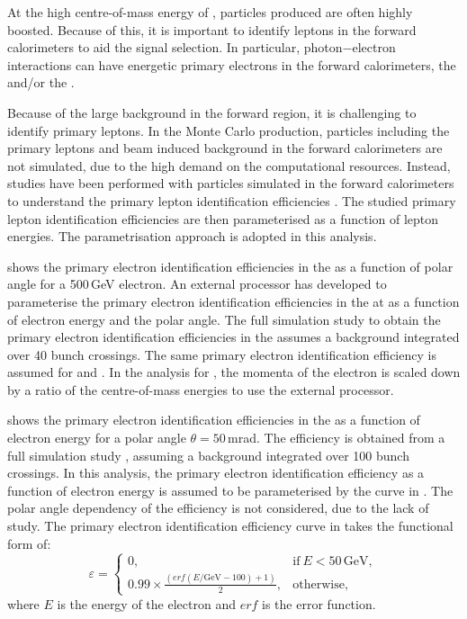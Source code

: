 At the high centre-of-mass energy of \CLIC, particles produced are often highly boosted.  Because of this, it is important to identify leptons in the forward calorimeters to aid the signal selection. In particular, photon$-$electron interactions can have energetic primary  electrons in  the forward calorimeters, the \LumiCAL and/or the \BeamCAL.

Because of the large background in the forward region, it is challenging to identify primary leptons. In the Monte Carlo production, particles including the primary leptons and beam induced background in the forward calorimeters are not simulated, due to the high demand on the computational resources. Instead, studies have been performed with particles simulated in the forward calorimeters to understand the primary lepton identification efficiencies \cite{sailer2012radiation,Sailer:2017onh,Lukic:forwardElectron}. The studied  primary lepton identification efficiencies are then parameterised as a function of lepton energies. The parametrisation approach is adopted in this analysis.

 shows the primary electron identification efficiencies in the \BeamCAL as a function of polar angle for a 500\,GeV electron.  An external processor \cite{Sailer:2017onh} has developed to parameterise the primary electron identification efficiencies in the \BeamCAL at  as a function of electron energy and the polar angle. The full simulation study to obtain the primary electron identification efficiencies in the \BeamCAL assumes a background integrated over 40 bunch crossings.  The same primary electron identification efficiency is assumed for  and . In the analysis for , the momenta of the electron is scaled down by a ratio of the centre-of-mass energies to use the external processor.

 shows the primary electron identification efficiencies in the \LumiCAL as a function of electron energy for a polar angle $\theta = 50$\,mrad. The efficiency is obtained from a full simulation study \cite{Lukic:forwardElectron}, assuming a background integrated over 100 bunch crossings. In this analysis, the primary electron identification efficiency  as a function of electron energy is assumed to be parameterised by the curve in . The polar angle dependency of the efficiency is not considered, due to the lack of study. The primary electron identification efficiency curve in  takes the functional form of:
\begin{equation}
\varepsilon=
\begin{cases}
  0, & \text{if}\ E < 50\,\text{GeV},\\
  0.99 \times \frac{(erf(E / \text{GeV} - 100) + 1 )}{2}, & \text{otherwise},
\end{cases}
\end{equation}
where $E$ is the energy of the electron and $erf$ is the error function.

